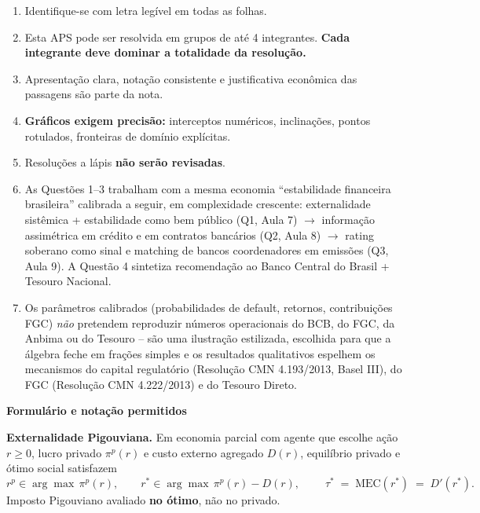 \documentclass[11pt,addpoints]{exam}
\newcommand{\MEC}{\text{MEC}}
\begin{document}
    \begin{enumerate}[noitemsep]
        \item Identifique-se com letra legível em todas as folhas.
        \item Esta APS pode ser resolvida em grupos de até 4 integrantes. \textbf{Cada integrante deve dominar a totalidade da resolução.}
        \item Apresentação clara, notação consistente e justificativa econômica das passagens são parte da nota.
        \item \textbf{Gráficos exigem precisão:} interceptos numéricos, inclinações, pontos rotulados, fronteiras de domínio explícitas.
        \item Resoluções a lápis \textbf{não serão revisadas}.
        \item As Questões 1--3 trabalham com a mesma economia ``estabilidade financeira brasileira'' calibrada a seguir, em complexidade crescente: externalidade sistêmica + estabilidade como bem público (Q1, Aula 7) $\to$ informação assimétrica em crédito e em contratos bancários (Q2, Aula 8) $\to$ rating soberano como sinal e matching de bancos coordenadores em emissões (Q3, Aula 9). A Questão 4 sintetiza recomendação ao Banco Central do Brasil + Tesouro Nacional.
        \item Os parâmetros calibrados (probabilidades de default, retornos, contribuições FGC) \textit{não} pretendem reproduzir números operacionais do BCB, do FGC, da Anbima ou do Tesouro -- são uma ilustração estilizada, escolhida para que a álgebra feche em frações simples e os resultados qualitativos espelhem os mecanismos do capital regulatório (Resolução CMN 4.193/2013, Basel III), do FGC (Resolução CMN 4.222/2013) e do Tesouro Direto.
    \end{enumerate}


    \vspace{0.5em}
    \noindent\hrulefill

    \noindent\textbf{Formulário e notação permitidos}
    \vspace{0.3em}

    \textbf{Externalidade Pigouviana.} Em economia parcial com agente que escolhe ação $r \geq 0$, lucro privado $\pi^p(r)$ e custo externo agregado $D(r)$, equilíbrio privado e ótimo social satisfazem
    \[
        r^p \in \arg\max\, \pi^p(r),\qquad
        r^* \in \arg\max\, \pi^p(r) - D(r),\qquad
        \boxed{\;\tau^* \;=\; \MEC(r^*) \;=\; D'(r^*).\;}
    \]
    Imposto Pigouviano avaliado \textbf{no ótimo}, não no privado.
\end{document}
